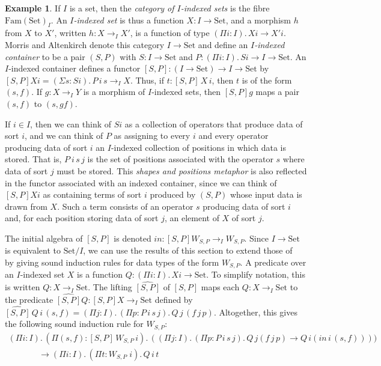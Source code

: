 \documentclass{LMCS}
\newcommand{\ra}{\rightarrow}
\newcommand{\Set}{\mbox{Set}}
\newcommand{\Fam}{\mbox{Fam}}
\theoremstyle{plain}
\theoremstyle{remark}
\theoremstyle{definition}
\newtheorem{example}[theorem]{Example}
\begin{document}
\begin{example}\label{ex:indind}
  If $I$ is a set, then the {\em category of $I$-indexed sets} is the
  fibre $\Fam(\Set)_I$. An {\em $I$-indexed set} is thus a function
  $X:I \ra \Set$, and a morphism $h$ from $X$ to $X'$, written $h : X
  \ra_I X'$, is a function of type $(\Pi i\!:\!I).\, X i \ra
  X'i$. Morris and Altenkirch denote this category $I \ra \Set$ and
  define an {\em $I$-indexed container} to be a pair $(S,P)$ with $S :
  I \ra \Set$ and $P : (\Pi i\!:\!I).\, Si \ra I \ra \Set$. An
  $I$-indexed container defines a functor $[S,P]: (I \ra \Set) \ra I
  \ra \Set$ by $[S,P] X i = (\Sigma s\!:\!Si).\, P \, i \, s \ra_{I}
  X$.  Thus, if $t \!:\! [S,P]\, X \, i$, then $t$ is of the form
  $(s,f)$. If $g : X \ra_I Y$ is a morphism of $I$-indexed sets, then
  $[S,P] g$ maps a pair $(s,f)$ to $(s,gf)$.

  If $i \in I$, then we can think of $S i$ as a collection of
  operators that produce data of sort $i$, and we can think of $P$ as
  assigning to every $i$ and every operator producing data of sort $i$
  an $I$-indexed collection of positions in which data is stored. That
  is, $P \ i \, s \, j$ is the set of positions associated with the
  operator $s$ where data of sort $j$ must be stored. This {\em shapes
    and positions metaphor} is also reflected in the functor
  associated with an indexed container, since we can think of $[S,P]X
  i$ as containing terms of sort $i$ produced by $(S,P)$ whose input
  data is drawn from $X$. Such a term consists of an operator $s$
  producing data of sort $i$ and, for each position storing data of
  sort $j$, an element of $X$ of sort $j$.

  The initial algebra of $[S,P]$ is denoted $\mathit{in}:[S,P] W_{S,P}
  \ra_I W_{S,P}$.  Since $I \ra \Set$ is equivalent to $\Set/I$, we
  can use the results of this section to extend those of~\cite{ma09}
  by giving sound induction rules for data types of the form
  $W_{S,P}$. A predicate over an $I$-indexed set $X$ is a function $Q:
  (\Pi i:I).\, X i \ra \Set$.  To simplify notation, this is written
  $Q:X \ra_I \Set$. The lifting $\widehat{[S,P]}$ of $[S,P]$ maps each
  $Q:X \ra_I \Set$ to the predicate $\widehat{[S,P]}Q : [S,P]X \ra_I
  \Set$ defined by $ \widehat{[S,P]} \, Q \, i \, (s,f) = (\Pi
  j\!:\!I).\, (\Pi p\!:\! P \, i \, s \, j). \, Q \, j \, (f \, j \,
  p)$.  Altogether, this gives the following sound induction rule for
  $W_{S,P}$:
\[\begin{array}{l}
  (\Pi i\!:\!I).\,(\Pi (s,f)\!:\![S,P]\, W_{S,P}\, i).\, 
  ((\Pi j\!:\!I).\,(\Pi p\!:\! P \, i \, s \, j). \, Q \, j (f \, j \,
  p) \ra Q \, i (\mathit{in} \, i \, (s,f)))) \\ 
  \;\;\;\;\;\;\;\;\;\;\;\;\;\ra 
  (\Pi i\!:\!I).\,(\Pi t\!:\! W_{S,P}\; i).\, Q \, i \, t
\end{array}
\]


\end{example}
\end{document}
